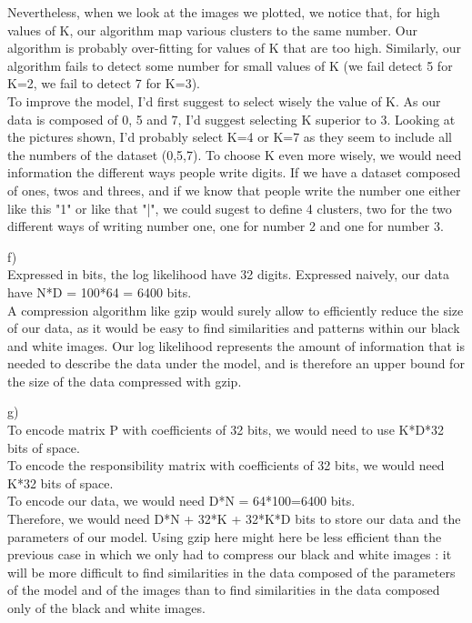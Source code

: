 \documentclass[12pt,a4paper]{report} %
\begin{document}
Nevertheless, when we look at the images we plotted, we notice that, for high values of K, our algorithm map various clusters to the same number. Our algorithm is probably over-fitting for values of K that are too high. Similarly, our algorithm fails to detect some number for small values of K (we fail detect 5 for K=2, we fail to detect 7 for K=3). \\

To improve the model, I'd first suggest to select wisely the value of K. As our data is composed of 0, 5 and 7, I'd suggest selecting K superior to 3. Looking at the pictures shown, I'd probably select K=4 or K=7 as they seem to include all the numbers of the dataset (0,5,7). To choose K even more wisely, we would need information the different ways people write digits. If we have a dataset composed of ones, twos and threes, and if we know that people write the number one either like this "1" or like that "|", we could sugest to define 4 clusters, two for the two different ways of writing number one, one for number 2 and one for number 3.\\

\item f)\\

Expressed in bits, the log likelihood have 32 digits. Expressed naively, our data have N*D = 100*64 = 6400 bits. \\

A compression algorithm like gzip would surely allow to efficiently reduce the size of our data, as it would be easy to find similarities and patterns within our black and white images. Our log likelihood represents the amount of information that is needed to describe the data under the model, and is therefore an upper bound for the size of the data compressed with gzip.\\

\item g)\\

To encode matrix P with coefficients of 32 bits, we would need to use K*D*32 bits of space. \\

To encode the responsibility matrix with coefficients of 32 bits, we would need K*32 bits of space.\\

To encode our data, we would need D*N = 64*100=6400 bits.\\

Therefore, we would need D*N + 32*K + 32*K*D bits to store our data and the parameters of our model. Using gzip here might here be less efficient than the previous case in which we only had to compress our black and white images : it will be more difficult to find similarities in the data composed of the parameters of the model and of the images than to find similarities in the data composed only of the black and white images.\\ 
\end{document}
